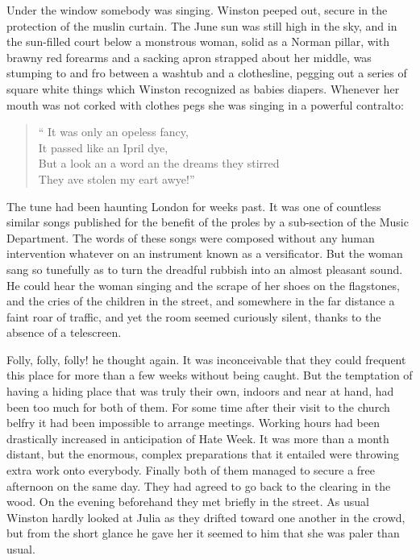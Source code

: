 Under the window somebody was singing. Winston peeped out, secure in the
protection of the muslin curtain. The June sun was still high in the
sky, and in the sun-filled court below a monstrous woman, solid as a
Norman pillar, with brawny red forearms and a sacking apron strapped
about her middle, was stumping to and fro between a washtub and a
clothesline, pegging out a series of square white things which Winston
recognized as babies\textquotesingle{} diapers. Whenever her mouth was
not corked with clothes pegs she was singing in a powerful contralto:

\begin{quotation}
  `` It was only an \textquotesingle opeless fancy,\\
  It passed like an Ipril dye,\\
  But a look an\textquotesingle{} a word an\textquotesingle{} the
  dreams they stirred\\
  They \textquotesingle ave stolen my \textquotesingle eart awye!''
\end{quotation}

The tune had been haunting London for weeks past. It was one of
countless similar songs published for the benefit of the proles by a
sub-section of the Music Department. The words of these songs were
composed without any human intervention whatever on an instrument known
as a versificator. But the woman sang so tunefully as to turn the
dreadful rubbish into an almost pleasant sound. He could hear the woman
singing and the scrape of her shoes on the flagstones, and the cries of
the children in the street, and somewhere in the far distance a faint
roar of traffic, and yet the room seemed curiously silent, thanks to the
absence of a telescreen.

Folly, folly, folly! he thought again. It was inconceivable that they
could frequent this place for more than a few weeks without being
caught. But the temptation of having a hiding place that was truly their
own, indoors and near at hand, had been too much for both of them. For
some time after their visit to the church belfry it had been impossible
to arrange meetings. Working hours had been drastically increased in
anticipation of Hate Week. It was more than a month distant, but the
enormous, complex preparations that it entailed were throwing extra work
onto everybody. Finally both of them managed to secure a free afternoon
on the same day. They had agreed to go back to the clearing in the wood.
On the evening beforehand they met briefly in the street. As usual
Winston hardly looked at Julia as they drifted toward one another in the
crowd, but from the short glance he gave her it seemed to him that she
was paler than usual.


